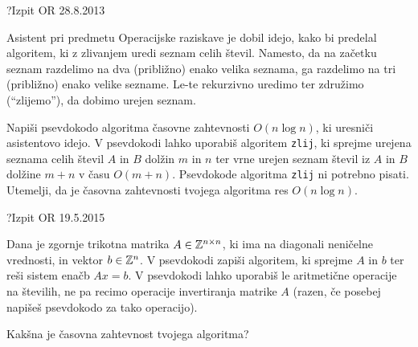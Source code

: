 \begin{naloga}{?}{Izpit OR 28.8.2013}
\begin{vprasanje}[zlivanje]
Asistent pri predmetu Operacijske raziskave je dobil idejo,
kako bi predelal algoritem, ki z zlivanjem uredi seznam celih števil.
Namesto,
da na začetku seznam razdelimo na dva (približno) enako velika seznama,
ga razdelimo na tri (približno) enako velike sezname.
Le-te rekurzivno uredimo ter združimo (``zlijemo''), da dobimo urejen seznam.

Napiši psevdokodo algoritma časovne zahtevnosti $O(n \log n)$,
ki uresniči asistentovo idejo.
V psevdokodi lahko uporabiš algoritem {\tt zlij},
ki sprejme urejena seznama celih števil $A$ in $B$ dolžin $m$ in $n$
ter vrne urejen seznam števil iz $A$ in $B$ dolžine $m+n$ v času $O(m+n)$.
Psevdokode algoritma {\tt zlij} ni potrebno pisati.
Utemelji, da je časovna zahtevnosti tvojega algoritma res $O(n \log n)$.
\end{vprasanje}
\begin{odgovor}
\end{odgovor}
\end{naloga}


\begin{naloga}{?}{Izpit OR 19.5.2015}
\begin{vprasanje}[sistem]
Dana je zgornje trikotna matrika $A \in \mathbb{Z}^{n \times n}$,
ki ima na diagonali neničelne vred\-no\-sti,
in vektor $b \in \mathbb{Z}^n$.
V psevdokodi zapiši algoritem, ki sprejme $A$ in $b$
ter reši sistem enačb $Ax = b$.
V psevdokodi lahko uporabiš le aritmetične operacije na številih,
ne pa recimo operacije invertiranja matrike $A$
(razen, če posebej napišeš psevdokodo za tako operacijo).

Kakšna je časovna zahtevnost tvojega algoritma?
\end{vprasanje}
\begin{odgovor}
\end{odgovor}
\end{naloga}


